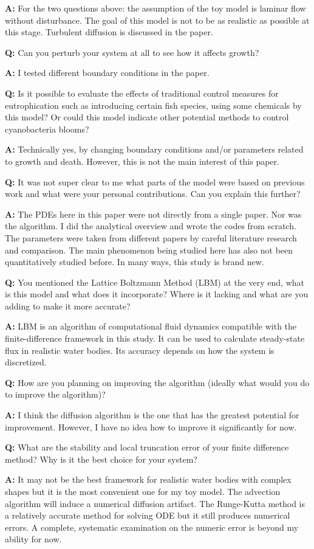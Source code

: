 \documentclass{article}
\begin{document}
\textbf{A:} For the two questions above: the assumption of the toy model is laminar flow without disturbance. The goal of this model is not to be as realistic as possible at this stage. Turbulent diffusion is discussed in the paper.
\bigskip

\textbf{Q:} Can you perturb your system at all to see how it affects growth?

\textbf{A:} I tested different boundary conditions in the paper.
\bigskip

\textbf{Q:} Is it possible to evaluate the effects of traditional control measures for eutrophication such as introducing certain fish species, using some chemicals by this model? Or could this model indicate other potential methods to control cyanobacteria blooms?

\textbf{A:} Technically yes, by changing boundary conditions and/or parameters related to growth and death. However, this is not the main interest of this paper.
\bigskip

\textbf{Q:} It was not super clear to me what parts of the model were based on previous work and what were your personal contributions. Can you explain this further?

\textbf{A:} The PDEs here in this paper were not directly from a single paper. Nor was the algorithm. I did the analytical overview and wrote the codes from scratch. The parameters were taken from different papers by careful literature research and comparison. The main phenomenon being studied here has also not been quantitatively studied before. In many ways, this study is brand new.
\bigskip

\textbf{Q:} You mentioned the Lattice Boltzmann Method (LBM) at the very end, what is this model and what does it incorporate? Where is it lacking and what are you adding to make it more accurate?

\textbf{A:} LBM is an algorithm of computational fluid dynamics compatible with the finite-difference framework in this study. It can be used to calculate steady-state flux in realistic water bodies. Its accuracy depends on how the system is discretized.
\bigskip

\textbf{Q:}  How are you planning on improving the algorithm (ideally what would you do to improve the algorithm)?

\textbf{A:} I think the diffusion algorithm is the one that has the greatest potential for improvement. However, I have no idea how to improve it significantly for now.
\bigskip

\textbf{Q:} What are the stability and local truncation error of your finite difference method? Why is it the best choice for your system?

\textbf{A:} It may not be the best framework for realistic water bodies with complex shapes but it is the most convenient one for my toy model. The advection algorithm will induce a numerical diffusion artifact. The Runge-Kutta method is a relatively accurate method for solving ODE but it still produces numerical errors. A complete, systematic examination on the numeric error is beyond my ability for now.
\end{document}
